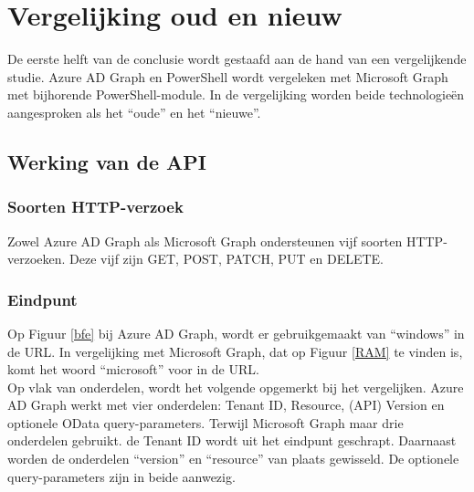 
\chapter{Vergelijking oud en nieuw}%
\label{ch:vergelijking}

De eerste helft van de conclusie wordt gestaafd aan de hand van een vergelijkende studie. Azure \ac{AD} Graph en PowerShell wordt vergeleken met Microsoft Graph met bijhorende PowerShell-module. In de vergelijking worden beide technologieën aangesproken als het “oude” en het “nieuwe”. 

\section{Werking van de API}


  

\subsection{Soorten HTTP-verzoek}

Zowel Azure \ac{AD} Graph als Microsoft Graph ondersteunen vijf soorten \ac{HTTP}-verzoeken. Deze vijf zijn GET, POST, PATCH, PUT en DELETE. 

\subsection{Eindpunt}

Op Figuur \ref{bfe} bij Azure \ac{AD} Graph, wordt er gebruikgemaakt van “windows” in de \ac{URL}. In vergelijking met Microsoft Graph, dat op Figuur \ref{RAM} te vinden is, komt het woord “microsoft” voor in de \ac{URL}. \\

Op vlak van onderdelen, wordt het volgende opgemerkt bij het vergelijken. Azure \ac{AD} Graph werkt met vier onderdelen: Tenant ID, Resource, (\ac{API}) Version en optionele OData query-parameters. Terwijl Microsoft Graph maar drie onderdelen gebruikt. de Tenant ID wordt uit het eindpunt geschrapt. Daarnaast worden de onderdelen “version” en “resource” van plaats gewisseld. De optionele query-parameters zijn in beide aanwezig. 




